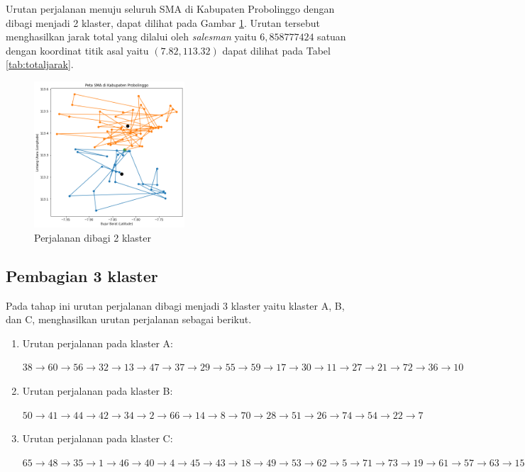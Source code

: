 Urutan perjalanan menuju seluruh SMA di Kabupaten Probolinggo dengan dibagi menjadi 2 klaster, dapat dilihat pada Gambar \ref{fig:hasil_mtsp2}. Urutan tersebut menghasilkan jarak total yang dilalui oleh \textit{salesman} yaitu $6,858777424$ satuan dengan koordinat titik asal yaitu $(7.82, 113.32)$ dapat dilihat pada Tabel \ref{tab:totaljarak}.


\begin{figure}[H]
\centering
\includegraphics[width=0.5\textwidth]{Gambar/hasil_mtsp/2}
\caption{Perjalanan dibagi 2 klaster}
\label{fig:hasil_mtsp2}
\end{figure}

\subsection{Pembagian 3 klaster}

Pada tahap ini urutan perjalanan dibagi menjadi 3 klaster yaitu klaster A, B, dan C, menghasilkan urutan perjalanan sebagai berikut.

\begin{enumerate}
\item Urutan perjalanan pada klaster A:

$38\rightarrow60\rightarrow56\rightarrow32\rightarrow13\rightarrow47\rightarrow37\rightarrow29\rightarrow55\rightarrow59\rightarrow17\rightarrow30\rightarrow11\rightarrow27\rightarrow21\rightarrow72\rightarrow36\rightarrow10$

\item Urutan perjalanan pada klaster B:

$50\rightarrow41\rightarrow44\rightarrow42\rightarrow34\rightarrow2\rightarrow66\rightarrow14\rightarrow8\rightarrow70\rightarrow28\rightarrow51\rightarrow26\rightarrow74\rightarrow54\rightarrow22\rightarrow7$

\item Urutan perjalanan pada klaster C:

$65\rightarrow48\rightarrow35\rightarrow1\rightarrow46\rightarrow40\rightarrow4\rightarrow45\rightarrow43\rightarrow18\rightarrow49\rightarrow53\rightarrow62\rightarrow5\rightarrow71\rightarrow73\rightarrow19\rightarrow61\rightarrow57\rightarrow63\rightarrow15\rightarrow25\rightarrow68\rightarrow58\rightarrow24\rightarrow31\rightarrow16\rightarrow3\rightarrow12\rightarrow20\rightarrow52\rightarrow67\rightarrow69\rightarrow75\rightarrow39\rightarrow6\rightarrow64\rightarrow23\rightarrow33\rightarrow9$

\end{enumerate}

